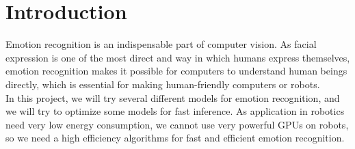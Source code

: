 \section{Introduction}
Emotion recognition is an indispensable part of computer vision. As facial expression is one of the most direct and way in which humans express themselves, emotion recognition makes it possible for computers to understand human beings directly, which is essential for making human-friendly computers or robots.\\

In this project, we will try several different models for emotion recognition, and we will try to optimize some models for fast inference. As application in robotics need very low energy consumption, we cannot use very powerful GPUs on robots, so we need a high efficiency algorithms for fast and efficient emotion recognition.